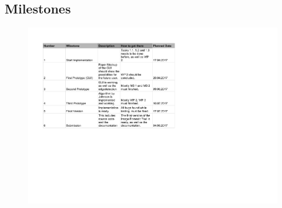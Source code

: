 \subsection{Milestones} \label{sec:Milestones}
\begin{figure}[H] 
	\center 
	\includegraphics[scale = 0.8]{Images/milestones.pdf}		
\end{figure}

